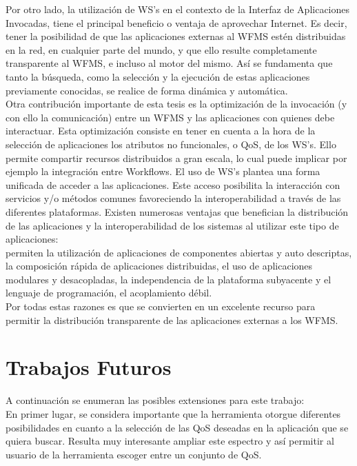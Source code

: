 Por otro lado, la utilización de WS's en el contexto de la Interfaz de Aplicaciones Invocadas, tiene el principal beneficio o ventaja de aprovechar Internet. Es decir, tener la posibilidad de que las aplicaciones externas al WFMS estén distribuidas en la red, en cualquier parte del mundo, y que ello resulte completamente transparente al WFMS, e incluso al motor del mismo. Así se fundamenta que tanto la búsqueda, como la selección y la ejecución de estas aplicaciones previamente conocidas, se realice de forma dinámica y automática.\\
Otra contribución importante de esta tesis es la optimización de la invocación (y con ello la comunicación) entre un WFMS y las aplicaciones con quienes debe interactuar. Esta optimización consiste en tener en cuenta a la hora de la selección de aplicaciones los atributos no funcionales, o QoS, de los WS's. Ello permite compartir recursos distribuidos a gran escala, lo cual puede implicar por ejemplo la integración entre Workflows.
El uso de WS's plantea una forma unificada de acceder a las aplicaciones. Este acceso posibilita la interacción con servicios y/o métodos comunes favoreciendo la interoperabilidad a través de las diferentes plataformas. Existen numerosas ventajas que benefician la distribución de las aplicaciones y la interoperabilidad de los sistemas al utilizar este tipo de aplicaciones:\\
permiten la utilización de aplicaciones de componentes abiertas y auto descriptas, la composición rápida de aplicaciones distribuidas, el uso de aplicaciones modulares y desacopladas, la independencia de la plataforma subyacente y el lenguaje de programación, el acoplamiento débil.\\

Por todas estas razones es que se convierten en un excelente recurso para permitir la distribución transparente de las aplicaciones externas a los WFMS.

\section{Trabajos Futuros}

A continuación se enumeran las posibles extensiones para este trabajo:\\

En primer lugar, se considera importante que la herramienta otorgue diferentes posibilidades en cuanto a la selección de las QoS deseadas en la aplicación que se quiera buscar. Resulta muy interesante ampliar este espectro y así permitir al usuario de la herramienta escoger entre un conjunto de QoS.\\

